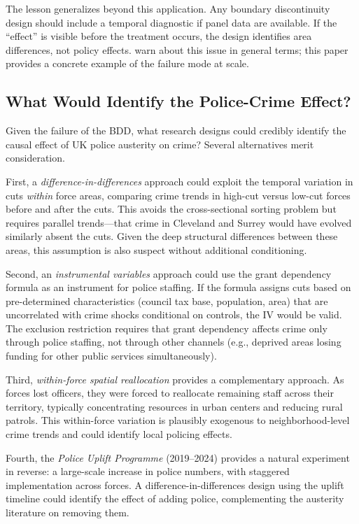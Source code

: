 \documentclass[12pt]{article}
\begin{document}
The lesson generalizes beyond this application. Any boundary discontinuity design should include a temporal diagnostic if panel data are available. If the ``effect'' is visible before the treatment occurs, the design identifies area differences, not policy effects. \citet{keele2015} warn about this issue in general terms; this paper provides a concrete example of the failure mode at scale.

\subsection{What Would Identify the Police-Crime Effect?}

Given the failure of the BDD, what research designs could credibly identify the causal effect of UK police austerity on crime? Several alternatives merit consideration.

First, a \textit{difference-in-differences} approach could exploit the temporal variation in cuts \textit{within} force areas, comparing crime trends in high-cut versus low-cut forces before and after the cuts. This avoids the cross-sectional sorting problem but requires parallel trends---that crime in Cleveland and Surrey would have evolved similarly absent the cuts. Given the deep structural differences between these areas, this assumption is also suspect without additional conditioning.

Second, an \textit{instrumental variables} approach could use the grant dependency formula as an instrument for police staffing. If the formula assigns cuts based on pre-determined characteristics (council tax base, population, area) that are uncorrelated with crime shocks conditional on controls, the IV would be valid. The exclusion restriction requires that grant dependency affects crime only through police staffing, not through other channels (e.g., deprived areas losing funding for other public services simultaneously).

Third, \textit{within-force spatial reallocation} provides a complementary approach. As forces lost officers, they were forced to reallocate remaining staff across their territory, typically concentrating resources in urban centers and reducing rural patrols. This within-force variation is plausibly exogenous to neighborhood-level crime trends and could identify local policing effects.

Fourth, the \textit{Police Uplift Programme} (2019--2024) provides a natural experiment in reverse: a large-scale increase in police numbers, with staggered implementation across forces. A difference-in-differences design using the uplift timeline could identify the effect of adding police, complementing the austerity literature on removing them.
\end{document}
